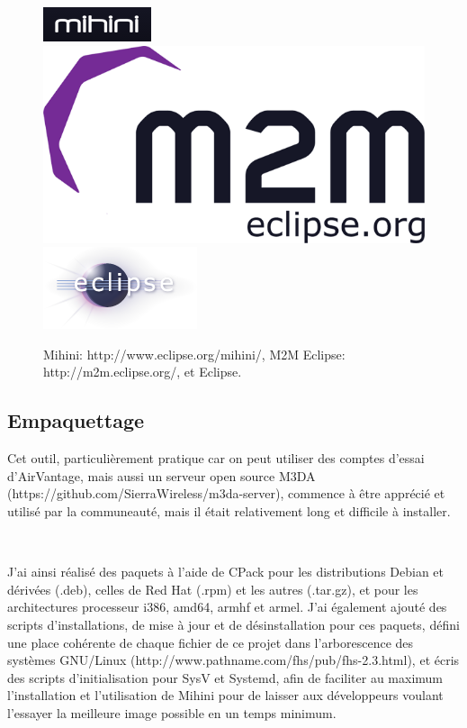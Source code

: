 \documentclass{article}
\begin{document}
\begin{figure}[h!]
    \centering
    \includegraphics{img/mihini_logo.png}
    \includegraphics[width=\linewidth/3]{img/M2M.png}
    \includegraphics{img/eclipse.png}
    \caption{Mihini: http://www.eclipse.org/mihini/, M2M Eclipse: http://m2m.eclipse.org/, et Eclipse.}
\end{figure}

\subsection{Empaquettage}
Cet outil, particulièrement pratique car on peut utiliser des comptes d’essai d’AirVantage, mais aussi un serveur open source M3DA (https://github.com/SierraWireless/m3da-server), commence à être apprécié et utilisé par la communeauté, mais il était relativement long et difficile à installer.

~

J’ai ainsi réalisé des paquets à l’aide de CPack pour les distributions Debian et dérivées (.deb), celles de Red Hat (.rpm) et les autres (.tar.gz), et pour les architectures processeur i386, amd64, armhf et armel. J’ai également ajouté des scripts d’installations, de mise à jour et de désinstallation pour ces paquets, défini une place cohérente de chaque fichier de ce projet dans l’arborescence des systèmes GNU/Linux (http://www.pathname.com/fhs/pub/fhs-2.3.html), et écris des scripts d’initialisation pour SysV et Systemd, afin de faciliter au maximum l’installation et l’utilisation de Mihini pour de laisser aux développeurs voulant l’essayer la meilleure image possible en un temps minimum.
\end{document}

